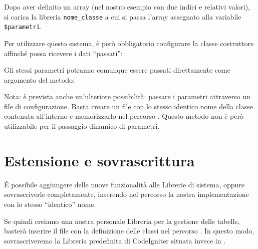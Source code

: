 
Dopo aver definito un array (nel nostro esempio con due indici e relativi valori), si carica la libreria \verb|nome_classe| a cui si passa l'array assegnato alla variabile \verb|$parametri|.

Per utilizzare questo sistema, è però obbligatorio configurare la classe costruttore affinché possa ricevere i dati ``passati'':


Gli stessi parametri potranno comunque essere passati direttamente come argomento del metodo:


Nota: è prevista anche un'ulteriore possibilità: passare i parametri attraverso un file di configurazione. Basta creare un file con lo stesso identico nome della classe contenuta all'interno e memorizzarlo nel percorso . Questo metodo non è però utilizzabile per il passaggio dinamico di parametri.

\section*{Estensione e sovrascrittura}
\'E possibile aggiungere delle nuove funzionalità alle Librerie di sistema, oppure sovrascriverle completamente, inserendo nel percorso  la nostra implementazione con lo stesso ``identico'' nome.

Se quindi creiamo una nostra personale Libreria per la gestione delle tabelle, basterà inserire il file  con la definizione delle classi nel percorso . In questo modo, sovrascriveremo la Libreria predefinita di CodeIgniter situata invece in .

